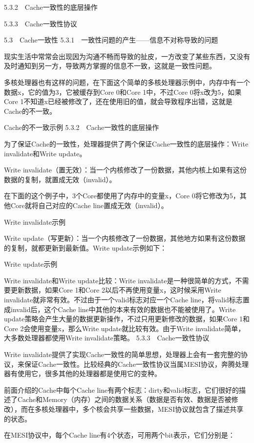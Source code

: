 \documentclass[12pt,UTF8]{ctexbook}
\begin{document}
5.3.2　Cache一致性的底层操作

5.3.3　Cache一致性协议


5.3　Cache一致性
5.3.1　一致性问题的产生——信息不对称导致的问题

现实生活中常常会出现因为沟通不畅而导致的扯皮，一方改变了某些东西，又没有及时通知到另一方，导致两方掌握的信息不一致，这就是一致性问题。

多核处理器也有这样的问题，在下面这个简单的多核处理器示例中，内存中有一个数据x，它的值为3，它被缓存到Core 0和Core 1中，不过Core 0将x改为5，如果Core 1不知道x已经被修改了，还在使用旧的值，就会导致程序出错，这就是Cache的不一致。

Cache的不一致示例
5.3.2　Cache一致性的底层操作

为了保证Cache的一致性，处理器提供了两个保证Cache一致性的底层操作：Write invalidate和Write update。

Write invalidate（置无效）：当一个内核修改了一份数据，其他内核上如果有这份数据的复制，就置成无效（invalid）。

在下面的这个例子中，3个Core都使用了内存中的变量x，Core 0将它修改为5，其他Core就将自己对应的Cache line置成无效（invalid）。

Write invalidate示例

Write update（写更新）：当一个内核修改了一份数据，其他地方如果有这份数据的复制，就都更新到最新值。Write update示例如下：

Write update示例

Write invalidate和Write update比较：Write invalidate是一种很简单的方式，不需要更新数据，如果Core 1和Core 2以后不再使用变量x，这时候采用Write invalidate就非常有效。不过由于一个valid标志对应一个Cache line，将valid标志置成invalid后，这个Cache line中其他的本来有效的数据也不能被使用了。Write update策略会产生大量的数据更新操作，不过只用更新修改的数据，如果Core 1和Core 2会使用变量x，那么Write update就比较有效。由于Write invalidate简单，大多数处理器都使用Write invalidate策略。
5.3.3　Cache一致性协议

Write invalidate提供了实现Cache一致性的简单思想，处理器上会有一套完整的协议，来保证Cache一致性。比较经典的Cache一致性协议当属MESI协议，奔腾处理器有使用它，很多其他的处理器都是使用它的变种。

前面介绍的Cache中每个Cache line有两个标志：dirty和valid标志，它们很好的描述了Cache和Memory（内存）之间的数据关系（数据是否有效、数据是否被修改），而在多核处理器中，多个核会共享一些数据，MESI协议就包含了描述共享的状态。

在MESI协议中，每个Cache line有4个状态，可用两个bit表示，它们分别是：
\end{document}

